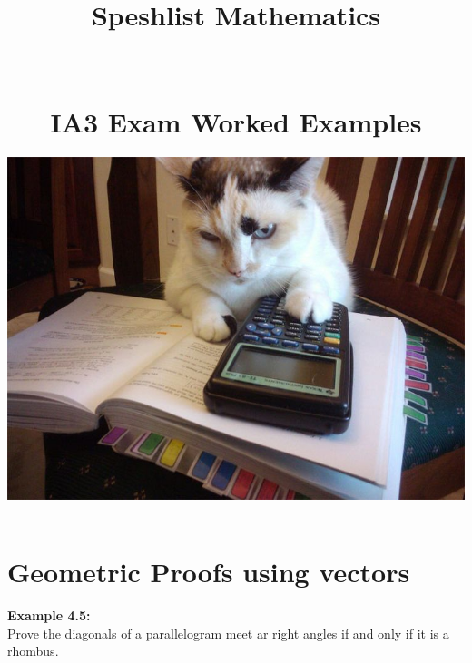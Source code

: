 \documentclass[10pt,a4paper]{article}
\newcommand{\dotline}{\noindent\makebox[\linewidth]{\dotfill}\\[1em]}
\begin{document}
	\begin{titlepage}
		\title{ \textbf{\Huge Speshlist Mathematics \\ \hfill \\ \hfill \\ IA3 Exam Worked Examples}}
		\date{		\includegraphics[width=0.8\paperwidth]{cat.png}}

	\end{titlepage}
	\maketitle

	\newpage
	\section{Geometric Proofs using vectors}
	\pagestyle{fancy}
	 
\textbf{\textcolor{OliveGreen}{Example 4.5}:}\\
Prove the diagonals of a parallelogram meet ar right angles if and only if it is a rhombus.\\

\dotline
\dotline
\dotline
\dotline
\dotline
\dotline
\dotline
\dotline
\dotline
\dotline
\dotline
\dotline
\dotline
\dotline
\dotline
\dotline
\dotline
\dotline
\dotline
\dotline
\dotline
\dotline
\dotline
\dotline
\dotline
\dotline
\dotline
\dotline
\end{document}
